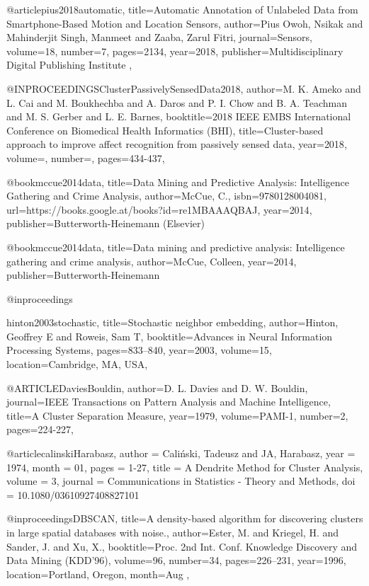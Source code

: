 @article{pius2018automatic,
  title={Automatic Annotation of Unlabeled Data from Smartphone-Based Motion and Location Sensors},
  author={Pius Owoh, Nsikak and Mahinderjit Singh, Manmeet and Zaaba, Zarul Fitri},
  journal={Sensors},
  volume={18},
  number={7},
  pages={2134},
  year={2018},
  publisher={Multidisciplinary Digital Publishing Institute}
},

@INPROCEEDINGS{ClusterPassivelySensedData2018,  
author={M. K. {Ameko} and L. {Cai} and M. {Boukhechba} and A. {Daros} and P. I. {Chow} and B. A. {Teachman} and M. S. {Gerber} and L. E. {Barnes}},  
booktitle={2018 IEEE EMBS International Conference on Biomedical   Health Informatics (BHI)},  
title={Cluster-based approach to improve affect recognition from passively sensed data},   
year={2018},  
volume={},  
number={},  
pages={434-437},}


@book{mccue2014data,
  title={Data Mining and Predictive Analysis: Intelligence Gathering and Crime Analysis},
  author={McCue, C.},
  isbn={9780128004081},
  url={https://books.google.at/books?id=re1MBAAAQBAJ},
  year={2014},
  publisher={Butterworth-Heinemann (Elsevier)}
}


@book{mccue2014data,
  title={Data mining and predictive analysis: Intelligence gathering and crime analysis},
  author={McCue, Colleen},
  year={2014},
  publisher={Butterworth-Heinemann}
}

@inproceedings{hinton2003stochastic,
  title={Stochastic neighbor embedding},
  author={Hinton, Geoffrey E and Roweis, Sam T},
  booktitle={Advances in Neural Information Processing Systems},
  pages={833--840},
  year={2003},
  volume={15},
  location={Cambridge, MA, USA},

  }


  @ARTICLE{DaviesBouldin,
  author={D. L. {Davies} and D. W. {Bouldin}},
  journal={IEEE Transactions on Pattern Analysis and Machine Intelligence}, 
  title={A Cluster Separation Measure}, 
  year={1979},
  volume={PAMI-1},
  number={2},
  pages={224-227},}


  @article{calinskiHarabasz,
author = {Caliński, Tadeusz and JA, Harabasz},
year = {1974},
month = {01},
pages = {1-27},
title = {A Dendrite Method for Cluster Analysis},
volume = {3},
journal = {Communications in Statistics - Theory and Methods},
doi = {10.1080/03610927408827101}
}

@inproceedings{DBSCAN,
  title={A density-based algorithm for discovering clusters in large spatial databases with noise.},
  author={Ester, M. and Kriegel, H. and Sander, J. and Xu, X.},
  booktitle={Proc. 2nd Int. Conf. Knowledge Discovery and Data Mining (KDD’96)},
  volume={96},
  number={34},
  pages={226--231},
  year={1996},
  location={Portland, Oregon},
  month={Aug}
},

